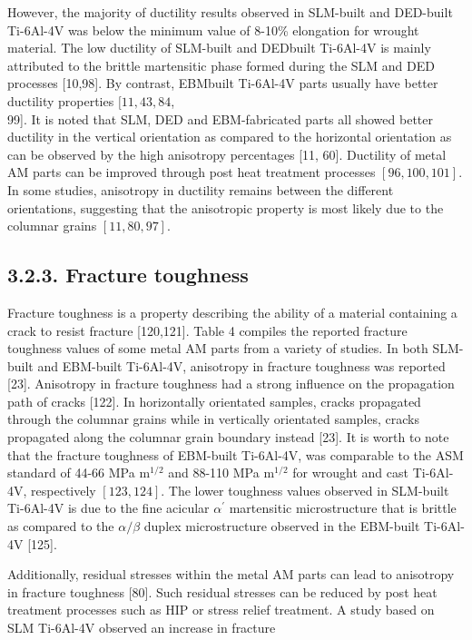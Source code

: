 \documentclass[10pt]{article}
\begin{document}
However, the majority of ductility results observed in SLM-built and DED-built Ti-6Al-4V was below the minimum value of 8-10\% elongation for wrought material. The low ductility of SLM-built and DEDbuilt Ti-6Al-4V is mainly attributed to the brittle martensitic phase formed during the SLM and DED processes [10,98]. By contrast, EBMbuilt Ti-6Al-4V parts usually have better ductility properties $[11,43,84$,\\
99]. It is noted that SLM, DED and EBM-fabricated parts all showed better ductility in the vertical orientation as compared to the horizontal orientation as can be observed by the high anisotropy percentages [11, 60]. Ductility of metal AM parts can be improved through post heat treatment processes $[96,100,101]$. In some studies, anisotropy in ductility remains between the different orientations, suggesting that the anisotropic property is most likely due to the columnar grains $[11,80,97]$.

\subsection*{3.2.3. Fracture toughness}
Fracture toughness is a property describing the ability of a material containing a crack to resist fracture [120,121]. Table 4 compiles the reported fracture toughness values of some metal AM parts from a variety of studies. In both SLM-built and EBM-built Ti-6Al-4V, anisotropy in fracture toughness was reported [23]. Anisotropy in fracture toughness had a strong influence on the propagation path of cracks [122]. In horizontally orientated samples, cracks propagated through the columnar grains while in vertically orientated samples, cracks propagated along the columnar grain boundary instead [23]. It is worth to note that the fracture toughness of EBM-built Ti-6Al-4V, was comparable to the ASM standard of 44-66 MPa $\mathrm{m}^{1 / 2}$ and 88-110 MPa $\mathrm{m}^{1 / 2}$ for wrought and cast Ti-6Al-4V, respectively $[123,124]$. The lower toughness values observed in SLM-built Ti-6Al-4V is due to the fine acicular $\alpha^{\prime}$ martensitic microstructure that is brittle as compared to the $\alpha / \beta$ duplex microstructure observed in the EBM-built Ti-6Al-4V [125].

Additionally, residual stresses within the metal AM parts can lead to anisotropy in fracture toughness [80]. Such residual stresses can be reduced by post heat treatment processes such as HIP or stress relief treatment. A study based on SLM Ti-6Al-4V observed an increase in fracture
\end{document}

